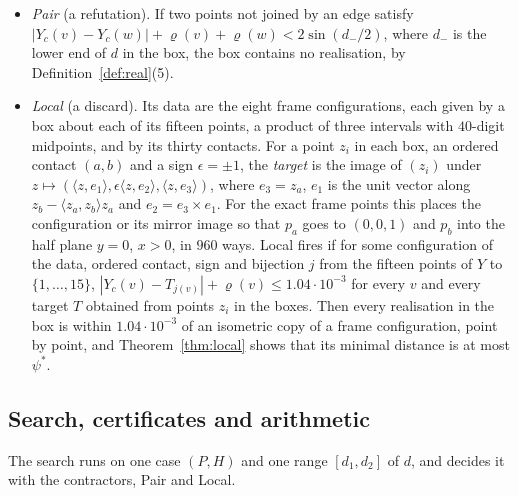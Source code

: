 \documentclass[12pt]{amsart}
\theoremstyle{definition}
\theoremstyle{plain}
\theoremstyle{definition}
\newcommand{\psis}{\psi^{*}}
\begin{document}
\begin{itemize}
\item \emph{Pair} (a refutation). If two points not joined by an edge satisfy $|Y_c(v)-Y_c(w)|+\varrho(v)+\varrho(w)<2\sin(d_-/2)$, where $d_-$ is the lower end of $d$ in the box, the box contains no realisation, by Definition~\ref{def:real}(5).
\item \emph{Local} (a discard). Its data are the eight frame configurations, each given by a box about each of its fifteen points, a product of three intervals with $40$-digit midpoints, and by its thirty contacts. For a point $z_i$ in each box, an ordered contact $(a,b)$ and a sign $\epsilon=\pm1$, the \emph{target} is the image of $(z_i)$ under $z\mapsto(\langle z,e_1\rangle,\epsilon\langle z,e_2\rangle,\langle z,e_3\rangle)$, where $e_3=z_a$, $e_1$ is the unit vector along $z_b-\langle z_a,z_b\rangle z_a$ and $e_2=e_3\times e_1$. For the exact frame points this places the configuration or its mirror image so that $p_a$ goes to $(0,0,1)$ and $p_b$ into the half plane $y=0$, $x>0$, in $960$ ways. Local fires if for some configuration of the data, ordered contact, sign and bijection $j$ from the fifteen points of $Y$ to $\{1,\dots,15\}$, $|Y_c(v)-T_{j(v)}|+\varrho(v)\le1.04\cdot10^{-3}$ for every $v$ and every target $T$ obtained from points $z_i$ in the boxes. Then every realisation in the box is within $1.04\cdot10^{-3}$ of an isometric copy of a frame configuration, point by point, and Theorem~\ref{thm:local} shows that its minimal distance is at most $\psis$.
\end{itemize}

\subsection{Search, certificates and arithmetic}\label{sec:search}
The search runs on one case $(P,H)$ and one range $[d_1,d_2]$ of $d$, and decides it with the contractors, Pair and Local.
\end{document}
